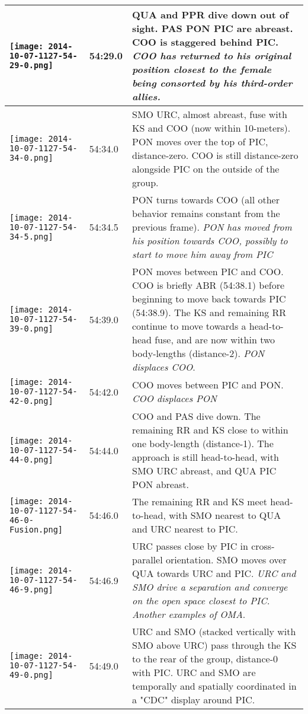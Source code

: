 \documentclass[11pt]{amsart}
\begin{document}
\begin{longtable}{| m{} | m{} | m{} |}
\texttt{[image: 2014-10-07-1127-54-29-0.png]} & 54:29.0 &  QUA and PPR dive down out of sight. PAS PON PIC are abreast. COO is staggered behind PIC. \textit{COO has returned to his original position closest to the female being consorted by his third-order allies.} \\ \hline
\texttt{[image: 2014-10-07-1127-54-34-0.png]} & 54:34.0 &  SMO URC, almost abreast, fuse with KS and COO (now within 10-meters). PON moves over the top of PIC, distance-zero. COO is still distance-zero alongside PIC on the outside of the group. \\ \hline
\texttt{[image: 2014-10-07-1127-54-34-5.png]} & 54:34.5 &  PON turns towards COO (all other behavior remains constant from the previous frame). \textit{PON has moved from his position towards COO, possibly to start to move him away from PIC} \\ \hline
\texttt{[image: 2014-10-07-1127-54-39-0.png]} & 54:39.0 &  PON moves between PIC and COO. COO is briefly ABR (54:38.1) before beginning to move back towards PIC (54:38.9). The KS and remaining RR continue to move towards a head-to-head fuse, and are now within two body-lengths (distance-2). \emph{PON displaces COO}. \\ \hline
\texttt{[image: 2014-10-07-1127-54-42-0.png]} & 54:42.0 & COO moves between PIC and PON. \emph{COO displaces PON} \\ \hline
\texttt{[image: 2014-10-07-1127-54-44-0.png]} & 54:44.0 & COO and PAS dive down. The remaining RR and KS close to within one body-length (distance-1). The approach is still head-to-head, with SMO URC abreast, and QUA PIC PON abreast. \\ \hline
\texttt{[image: 2014-10-07-1127-54-46-0-Fusion.png]} & 54:46.0 & The remaining RR and KS meet head-to-head, with SMO nearest to QUA and URC nearest to PIC. \\ \hline
\texttt{[image: 2014-10-07-1127-54-46-9.png]} & 54:46.9 & URC passes close by PIC in cross-parallel orientation. SMO moves over QUA towards URC and PIC. \textit{URC and SMO drive a separation and converge on the open space closest to PIC. Another examples of OMA}. \\ \hline
\texttt{[image: 2014-10-07-1127-54-49-0.png]} & 54:49.0 &  URC and SMO (stacked vertically with SMO above URC) pass through the KS to the rear of the group, distance-0 with PIC. URC and SMO are temporally and spatially coordinated in a "CDC" display around PIC. \\ \hline

\end{longtable}
\end{document}
